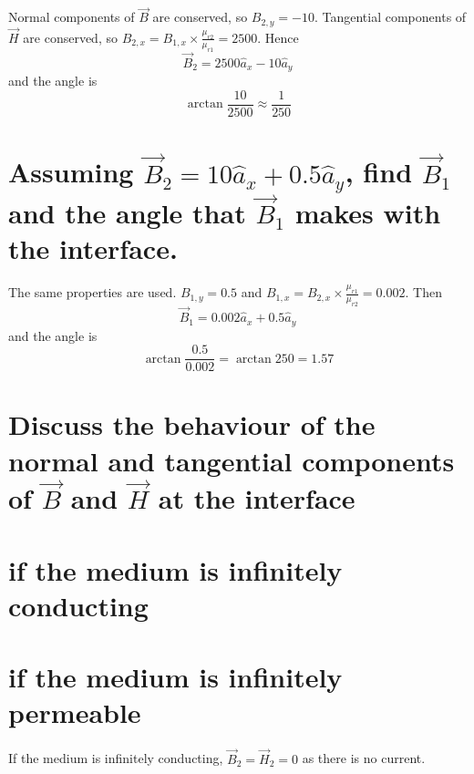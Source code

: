 \documentclass[answers]{exam}
\begin{document}
\begin{questions}
\begin{parts}
    \begin{solution}
        Normal components of $\vec B$ are conserved, so $B_{2,y} = -10$. Tangential components of $\vec H$ are conserved, so $B_{2,x} = B_{1,x}\times\frac{\mu_{r2}}{\mu_{r1}} = 2500$. Hence
        $$\vec B_2 = 2500\hat a_x - 10\hat a_y$$
        and the angle is
        $$\arctan\frac{10}{2500} \approx \frac{1}{250}$$
    \end{solution}
    
    \part{Assuming $\vec B_2 = 10\hat a_x + 0.5\hat a_y$, find $\vec B_1$ and the angle that $\vec B_1$ makes with the interface.}

    \begin{solution}
        The same properties are used. $B_{1,y} = 0.5$ and $B_{1,x} = B_{2,x}\times\frac{\mu_{r1}}{\mu_{r2}} = 0.002$. Then
        $$\vec B_1 = 0.002\hat a_x + 0.5\hat a_y$$
        and the angle is
        $$\arctan\frac{0.5}{0.002} = \arctan 250 = 1.57$$
    \end{solution}
\end{parts}


\begin{parts}
    \part{Discuss the behaviour of the normal and tangential components of $\vec B$ and $\vec H$ at the interface}
    \begin{parts}
        \part{if the medium is infinitely conducting}
        \part{if the medium is infinitely permeable}
    \end{parts}

    \begin{solution}
        If the medium is infinitely conducting, $\vec B_2 = \vec H_2 = 0$ as there is no current.
    \end{solution}


\end{parts}
\end{questions}
\end{document}

